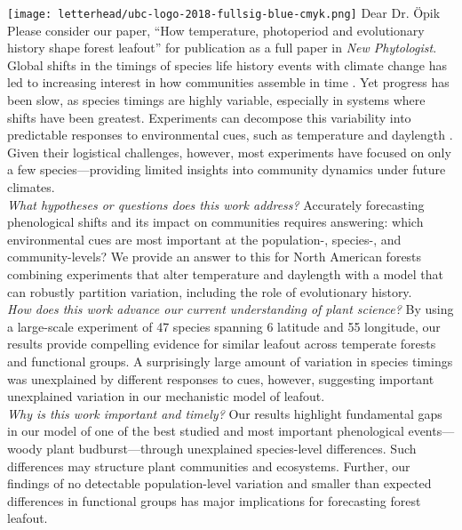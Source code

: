 \documentclass[11pt,a4paper]{article}
\begin{document}
\noindent \texttt{[image: letterhead/ubc-logo-2018-fullsig-blue-cmyk.png]}
\noindent Dear Dr. Öpik
\vspace{1.5ex}\\
\noindent Please consider our paper, ``How temperature, photoperiod and evolutionary history shape forest leafout'' for publication as a full paper in \emph{New Phytologist}. 
\vspace{1.5ex}\\ 
Global shifts in the timings of species life history events with climate change has led to increasing interest in how communities assemble in time \citep{Cope2022, Cleland2024}. Yet progress has been slow, as species timings are highly variable, especially in systems where shifts have been greatest. Experiments can decompose this variability into predictable responses to environmental cues, such as temperature and daylength \citep{Basler2014,Vitasse2014,Zohner2016}. Given their logistical challenges, however, most experiments have focused on only a few species---providing limited insights into community dynamics under future climates.
\vspace{1.5ex}\\ 
\noindent \textit{What hypotheses or questions does this work address?} Accurately forecasting phenological shifts and its impact on communities requires answering: which environmental cues are most important at the population-, species-, and community-levels? We provide an answer to this for North American forests combining experiments that alter temperature and daylength with a model that can robustly partition variation, including the role of evolutionary history. 
\vspace{1.5ex}\\ 
\noindent \textit{How does this work advance our current understanding of plant science?}  By using a large-scale experiment of 47 species spanning 6 latitude and 55 longitude, our results provide compelling evidence for similar leafout across temperate forests and functional groups. A surprisingly large amount of variation in species timings was unexplained by different responses to cues, however, suggesting important unexplained variation in our mechanistic model of leafout.  
\vspace{1.5ex}\\
\noindent \textit{Why is this work important and timely?} Our results highlight fundamental gaps in our model of one of the best studied and most important phenological events---woody plant budburst---through unexplained species-level differences. Such differences may structure plant communities and ecosystems. Further, our findings of no detectable population-level variation and smaller than expected differences in functional groups has major implications for forecasting forest leafout. %
\end{document}
